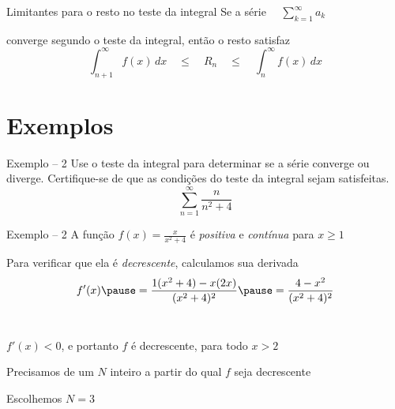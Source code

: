 \begin{frame}{Limitantes para o resto no teste da integral}
  Se a série
  \(
    \quad \sum_{k=1}^{\infty} a_k
  \)

  \vspace{0.5\baselineskip}
  converge segundo o teste da integral, então o resto satisfaz
  \[
    \int_{n+1}^{\infty} f(x)\,dx
    \quad\leq\quad
    R_n
    \quad\leq\quad
    \int_{n}^{\infty} f(x)\,dx
  \]
\end{frame}

\section{Exemplos}

\begin{frame}{Exemplo -- 2}
  Use o teste da integral para determinar se a série converge ou diverge.
  Certifique-se de que as condições do teste da integral sejam satisfeitas.
  \[
  \sum_{n=1}^{\infty} \frac{n}{n^2+4}
  \]
\end{frame}

\begin{frame}{Exemplo -- 2}
  A função \(f(x)=\frac{x}{x^2+4}\) é \emph{positiva} e \emph{contínua} para $x\geq 1$

  \pause
  \vspace{\baselineskip}
  Para verificar que ela é \emph{decrescente}, calculamos sua derivada
  \[
    f'(x)
    \pause
    = \frac{1(x^2+4) - x(2x)}{(x^2+4)^2}
    \pause
    = \frac{4-x^2}{(x^2+4)^2}
  \]
  ~

  \pause
  $f'(x)<0$, e portanto $f$ é decrescente, para todo $x>2$

  \pause
  \vspace{\baselineskip}
  Precisamos de um $N$ inteiro a partir do qual $f$ seja decrescente

  \pause
  \vspace{\baselineskip}
  Escolhemos $N=3$
\end{frame}


